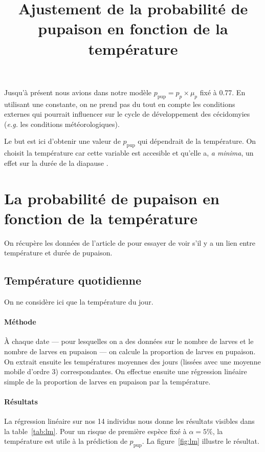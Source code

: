 \documentclass[a4paper, 11pt]{article}
\title{Ajustement de la probabilité de pupaison en fonction de la température}
\author{}
\date{}
\begin{document}
 \maketitle
 
 Jusqu'à présent nous avions dans notre modèle $p_{\text{pup}} = p_p \times \mu_p$ fixé à 0.77. En utilisant une constante, on ne prend pas du tout en compte les conditions externes qui pourrait influencer sur le cycle de développement des cécidomyies (\emph{e.g.} les conditions météorologiques).
 
 Le but est ici d'obtenir une valeur de $p_{\text{pup}}$ qui dépendrait de la température. On choisit la température car cette variable est accesible et qu'elle a, \emph{a minima}, un effet sur la durée de la diapause \citep{a2014}.
 
 \section{La probabilité de pupaison en fonction de la température}
 
  On récupère les données de l'article de \citet{a2014} pour essayer de voir s'il y a un lien entre température et durée de pupaison.
 
 \subsection{Température quotidienne}
 
 On ne considère ici que la température du jour.
 
 \paragraph{Méthode} À chaque date --- pour lesquelles on a des données sur le nombre de larves et le nombre de larves en pupaison --- on calcule la proportion de larves en pupaison. On extrait ensuite les températures moyennes des jours (lissées avec une moyenne mobile d'ordre 3) correspondantes. On effectue ensuite une régression linéaire simple de la proportion de larves en pupaison par la température.
 
 \paragraph{Résultats} La régression linéaire sur nos 14 individus nous donne les résultats visibles dans la table~\ref{tab:lm}. Pour un risque de première espèce fixé à $\alpha = 5\%$, la température est utile à la prédiction de $p_{\text{pup}}$. La figure~\ref{fig:lm} illustre le résultat.
 
\end{document}
